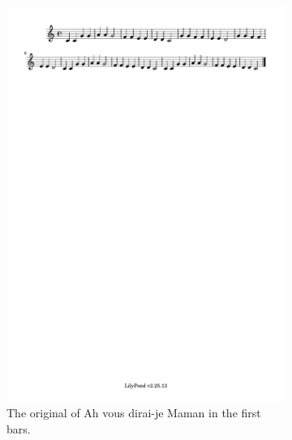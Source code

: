 \documentclass[11pt]{article}
\theoremstyle{definition}
\begin{document}
\begin{figure}
\centering
\begin{subfigure}{\textwidth}
\centering
\includegraphics[trim=1cm 26.5cm 14.325cm 0.02cm, clip, scale=1]{dabby_1.pdf} %
\caption{The original of Ah vous dirai-je Maman in the first bars.}
\label{fig:MV1} 
\end{subfigure}
\begin{subfigure}{\textwidth}
\centering

\end{subfigure}
\end{figure}
\end{document}

